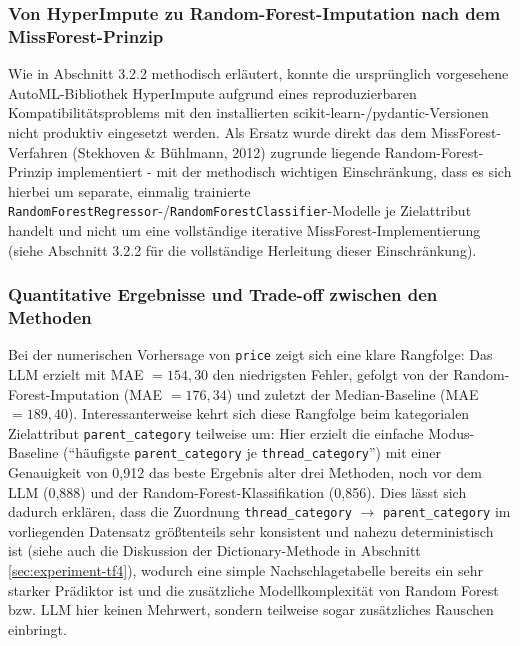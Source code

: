 \subsubsection{Von HyperImpute zu Random-Forest-Imputation nach dem MissForest-Prinzip}

Wie in Abschnitt 3.2.2 methodisch erläutert, konnte die ursprünglich
vorgesehene AutoML-Bibliothek HyperImpute aufgrund eines reproduzierbaren
Kompatibilitätsproblems mit den installierten scikit-learn-/pydantic-Versionen
nicht produktiv eingesetzt werden. Als Ersatz wurde direkt das dem
MissForest-Verfahren (Stekhoven \& Bühlmann, 2012)\autocite{stekhoven2012missforest}
zugrunde liegende Random-Forest-Prinzip implementiert - mit der methodisch
wichtigen Einschränkung, dass es sich hierbei um separate, einmalig trainierte
\texttt{RandomForestRegressor}-/\texttt{RandomForestClassifier}-Modelle je
Zielattribut handelt und nicht um eine vollständige iterative
MissForest-Implementierung (siehe Abschnitt 3.2.2 für die vollständige
Herleitung dieser Einschränkung).

\subsubsection{Quantitative Ergebnisse und Trade-off zwischen den Methoden}

Bei der numerischen Vorhersage von \texttt{price} zeigt sich eine klare
Rangfolge: Das LLM erzielt mit MAE $= 154{,}30$ den niedrigsten Fehler, gefolgt
von der Random-Forest-Imputation (MAE $= 176{,}34$) und zuletzt der
Median-Baseline (MAE $= 189{,}40$). Interessanterweise kehrt sich diese
Rangfolge beim kategorialen Zielattribut \texttt{parent\_category} teilweise
um: Hier erzielt die einfache Modus-Baseline (\enquote{häufigste
\texttt{parent\_category} je \texttt{thread\_category}}) mit einer Genauigkeit
von 0{,}912 das beste Ergebnis alter drei Methoden, noch vor dem LLM (0{,}888)
und der Random-Forest-Klassifikation (0{,}856). Dies lässt sich dadurch
erklären, dass die Zuordnung \texttt{thread\_category} $\rightarrow$
\texttt{parent\_category} im vorliegenden Datensatz größtenteils sehr
konsistent und nahezu deterministisch ist (siehe auch die Diskussion der
Dictionary-Methode in Abschnitt \ref{sec:experiment-tf4}), wodurch eine simple
Nachschlagetabelle bereits ein sehr starker Prädiktor ist und die
zusätzliche Modellkomplexität von Random Forest bzw. LLM hier keinen Mehrwert,
sondern teilweise sogar zusätzliches Rauschen einbringt.

